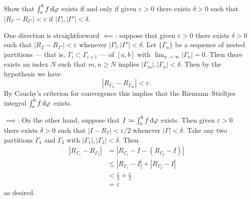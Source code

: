 \begin{problem}
  Show that $\int_a^bf\mathop{}\!\mathrm{d}\varphi$ exists if and only if given
  $\varepsilon>0$ there exists $\delta>0$ such that
  $\left|R_\Gamma-R_{\Gamma'}\right|<\varepsilon$ if
  $|\Gamma|,|\Gamma'|<\delta$.
\end{problem}
\begin{solution}
  One direction is straightforward $\impliedby$: suppose that given
  $\varepsilon>0$ there exists $\delta>0$ such that
  $|R_\Gamma-R_{\Gamma'}|<\varepsilon$ whenever
  $|\Gamma|,|\Gamma'|<\delta$. Let $\{\Gamma_n\}$ be a sequence of nested
  partitions --- that is, $\Gamma_i\subset\Gamma_{i+1}$ --- of $[a,b]$ with
  $\lim_{n\to\infty}|\Gamma_n|=0$. Then there exists an index $N$ such that
  $m,n\geq N$ implies $|\Gamma_m|,|\Gamma_n|<\delta$. Then by the
  hypothesis we have
  \[
    \left|R_{\Gamma_n}-R_{\Gamma_m}\right|<\varepsilon.
  \]
  By Cauchy's criterion for convergence this implies that the
  Riemann--Stieltjes integral $\int_a^b f\mathop{}\!\mathrm{d}\varphi$ exists.

  $\implies$: On the other hand, suppose that
  $I\coloneq\int_a^b f\mathop{}\!\mathrm{d}\varphi$ exists. Then given $\varepsilon>0$
  there exists $\delta>0$ such that $|I-R_\Gamma|<\varepsilon/2$ whenever
  $|\Gamma|<\delta$. Take any two partitions $\Gamma_1$ and $\Gamma_2$ with
  $|\Gamma_1|,|\Gamma_2|<\delta$. Then
  \begin{align*}
    |R_{\Gamma_1}-R_{\Gamma_2}|
    &=\left|R_{\Gamma_1}-I-(R_{\Gamma_2}-I)\right|\\
    &\leq|R_{\Gamma_1}-I|+|R_{\Gamma_2}-I|\\
    &<\frac{\varepsilon}{2}+\frac{\varepsilon}{2}\\
    &=\varepsilon
  \end{align*}
  as desired.
\end{solution}

